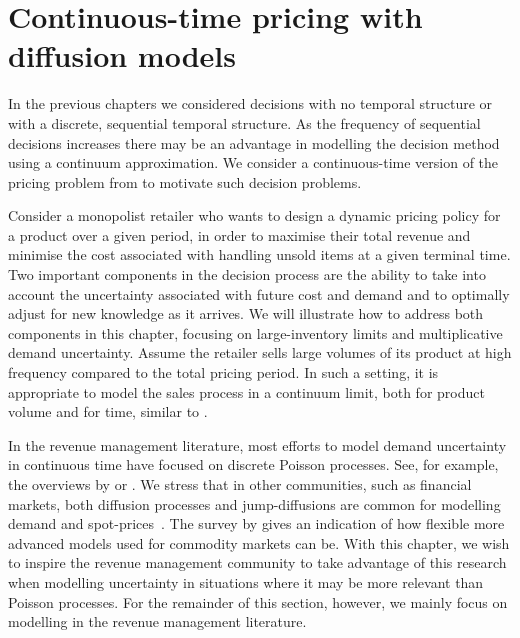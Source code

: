 \documentclass[main.tex]{subfiles}
\begin{document}
\chapter{Continuous-time pricing with diffusion
  models}\label{ch:cts_control}

In the previous chapters we considered decisions with no temporal
structure or with a discrete, sequential temporal structure.
As the frequency of sequential decisions increases there may be an
advantage in modelling the decision method using a continuum
approximation.
We consider a continuous-time version of the pricing problem from
 to motivate such decision problems.

Consider a monopolist retailer who wants to design a dynamic pricing policy
for a product over a given period, in order to maximise their total
revenue and minimise the cost associated with handling unsold items
at a given terminal time.
Two important components in the decision process are the ability to
take into account the uncertainty associated with future cost and demand and to
optimally adjust for new knowledge as it arrives.
We will illustrate how to address both components in this chapter,
focusing on large-inventory limits and multiplicative demand
uncertainty.
Assume the retailer sells large volumes of its product at
high frequency compared to the total pricing period. In such a setting, it is
appropriate to model the sales process in a continuum limit, both for
product volume and for time, similar to \citet{kalish1983monopolist}.

In the revenue management literature, most efforts to model demand uncertainty in
continuous time have focused on discrete Poisson
processes. See, for example, the overviews by \citet{bitran2003overview}
or \citet{aviv2012dynamic}.
We stress that in other communities, such as financial markets,
both diffusion processes and jump-diffusions are common for modelling
demand and spot-prices~\citep{benth2014stochastic}. The survey by \citet{carmona2014survey}
gives an indication of how flexible more advanced models used for commodity
markets can be. With this chapter, we wish to inspire the revenue
management community to take advantage of this research when modelling
uncertainty in situations where it may be more relevant than Poisson
processes. For the remainder of this section,
however, we mainly focus on modelling in the revenue management literature.
\end{document}
